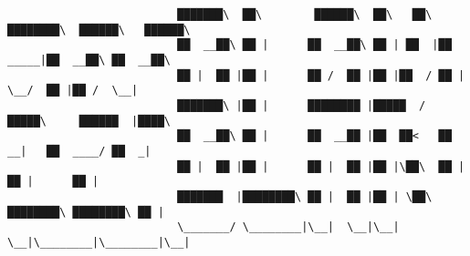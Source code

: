 \documentclass[varwidth=\maxdimen,margin=0.5cm,multi={verbatim}]{standalone}
\begin{document}
\begin{verbatim}
                          ███████\  ██\        ██████\  ██\   ██\ ████████\  ██████\   ██████\  
                          ██  __██\ ██ |      ██  __██\ ██ | ██  |██  _____|██  __██\ ██  __██\ 
                          ██ |  ██ |██ |      ██ /  ██ |██ |██  / ██ |      \__/  ██ |██ /  \__|
                          ███████\ |██ |      ████████ |█████  /  █████\     ██████  |████\     
                          ██  __██\ ██ |      ██  __██ |██  ██<   ██  __|   ██  ____/ ██  _|    
                          ██ |  ██ |██ |      ██ |  ██ |██ |\██\  ██ |      ██ |      ██ |      
                          ███████  |████████\ ██ |  ██ |██ | \██\ ████████\ ████████\ ██ |      
                          \_______/ \________|\__|  \__|\__|  \__|\________|\________|\__|




\end{verbatim}
\end{document}
